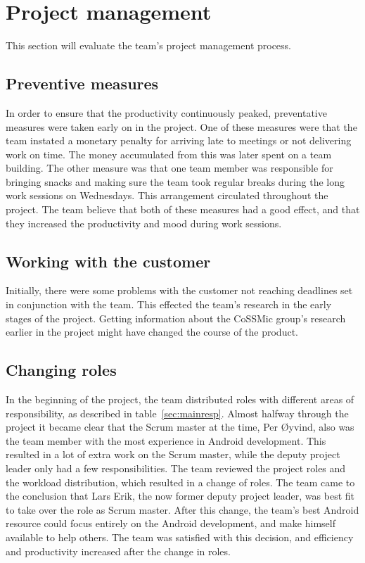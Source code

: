 \newpage
\section{Project management}
This section will evaluate the team's project management process.

\subsection{Preventive measures}
In order to ensure that the productivity continuously peaked, preventative measures were taken early on in the project. One of these measures were that the team instated a monetary penalty for arriving late to meetings or not delivering work on time. The money accumulated from this was later spent on a team building. The other measure was that one team member was responsible for bringing snacks and making sure the team took regular breaks during the long work sessions on Wednesdays. This arrangement circulated throughout the project. The team believe that both of these measures had a good effect, and that they increased the productivity and mood during work sessions.

\subsection{Working with the customer}
 Initially, there were some problems with the customer not reaching deadlines set in conjunction with the team. This effected the team's research in the early stages of the project. Getting information about the CoSSMic group's research earlier in the project might have changed the course of the product. 

\subsection{Changing roles}
\label{sec:unbalancedWorkload}
In the beginning of the project, the team distributed roles with different areas of responsibility, as described in table~\ref{sec:mainresp}. Almost halfway through the project it became clear that the Scrum master at the time, Per Øyvind, also was the team member with the most experience in Android development. This resulted in a lot of extra work on the Scrum master, while the deputy project leader only had a few responsibilities. The team reviewed the project roles and the workload distribution, which resulted in a change of roles. The team came to the conclusion that Lars Erik, the now former deputy project leader, was best fit to take over the role as Scrum master. After this change, the team's best Android resource could focus entirely on the Android development, and make himself available to help others. The team was satisfied with this decision, and efficiency and productivity increased after the change in roles.

